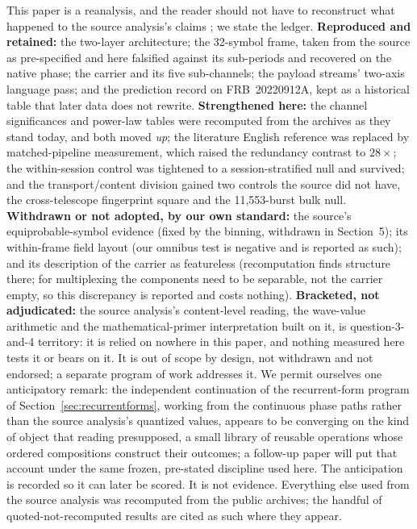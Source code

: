 \documentclass[11pt,a4paper]{article}
\begin{document}
This paper is a reanalysis, and the reader should not have to reconstruct what
happened to the source analysis's claims \cite{meucci2026}; we state the ledger.
\textbf{Reproduced and retained:} the two-layer architecture; the 32-symbol frame,
taken from the source as pre-specified and here falsified against its sub-periods and
recovered on the native phase; the carrier and its five sub-channels; the payload
streams' two-axis language pass; and the prediction record on FRB~20220912A, kept as
a historical table that later data does not rewrite. \textbf{Strengthened here:} the
channel significances and power-law tables were recomputed from the archives as they
stand today, and both moved \emph{up}; the literature English reference was replaced
by matched-pipeline measurement, which raised the redundancy contrast to
$28\times$; the within-session control was tightened to a session-stratified null and
survived; and the transport/content division gained two controls the source did not
have, the cross-telescope fingerprint square and the 11{,}553-burst bulk null.
\textbf{Withdrawn or not adopted, by our own standard:} the source's
equiprobable-symbol evidence (fixed by the binning, withdrawn in
Section~5); its within-frame field layout (our omnibus test is negative and is
reported as such); and its description of the carrier as featureless (recomputation
finds structure there; for multiplexing the components need to be separable, not the
carrier empty, so this discrepancy is reported and costs nothing).
\textbf{Bracketed, not adjudicated:} the source analysis's content-level reading, the
wave-value arithmetic and the mathematical-primer interpretation built on it, is
question-3-and-4 territory: it is relied on nowhere in this paper, and nothing
measured here tests it or bears on it. It is out of scope by design, not withdrawn
and not endorsed; a separate program of work addresses it. We permit ourselves one
anticipatory remark: the independent continuation of the recurrent-form program of
Section~\ref{sec:recurrentforms}, working from the continuous phase paths rather than
the source analysis's quantized values, appears to be converging on the kind of
object that reading presupposed, a small library of reusable operations whose ordered
compositions construct their outcomes; a follow-up paper will put that account under
the same frozen, pre-stated discipline used here. The anticipation is recorded so it
can later be scored. It is not evidence. Everything else
used from the source analysis was recomputed from the public archives; the handful of
quoted-not-recomputed results are cited as such where they appear.
\end{document}
